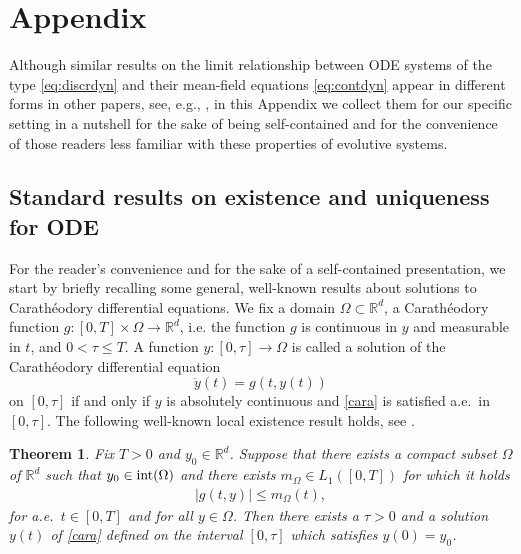 \documentclass[A4paper,11pt]{article}
\newtheorem{theorem}{Theorem}[section]
\theoremstyle{definition}
\newcommand{\R}{\mathbb{R}}
\begin{document}
\section{Appendix}

 Although  similar results on the limit relationship between ODE systems of the type \eqref{eq:discrdyn} and their mean-field equations \eqref{eq:contdyn}
appear in different forms in other papers, see, e.g., \cite{AGS,CanCarRos10,13-Carrillo-Choi-Hauray-MFL,MFOC}, in this Appendix we collect them for our specific setting in a nutshell for the sake of being self-contained and for the convenience of those readers less familiar with these properties of evolutive systems.

\subsection{Standard results on existence and uniqueness for ODE}\label{ap00}

For the reader's convenience and for the sake of a self-contained presentation, we start by briefly recalling some general, well-known results about solutions to Carath{\'e}odory differential equations. We fix a domain $\Omega \subset \R^d$, a Carath{\'e}odory function $g\colon[0,T]\times \Omega \to \R^d$, i.e. the function $g$ is continuous in $y$ and measurable in $t$, and $0<\tau \le T$. A function $y\colon [0,\tau]\to \Omega$ is called a solution of the Carath{\'e}odory differential equation
\begin{equation}\label{cara}
\dot y(t)=g(t, y(t))
\end{equation}
on $[0,\tau]$ if and only if $y$ is absolutely continuous and \eqref{cara} is satisfied a.e.\ in $[0,\tau]$.
The following well-known local existence result holds, see \cite[Chapter 1, Theorem 1]{Fil} .


\begin{theorem}\label{cara-local}
Fix $T > 0$ and $y_0 \in \R^d$. Suppose that there exists a compact subset $\Omega$ of $\R^d$ such that $y_0 \in \textup{int}(\Omega)$ and there exists $m_{\Omega} \in L_1([0,T])$ for which it holds
\begin{align}\label{l1}
|g(t,y)|\le m_{\Omega}(t),
\end{align}
for a.e.\ $t \in [0,T]$ and for all $y \in \Omega$. Then there exists a $\tau > 0$ and a solution $y(t)$ of \eqref{cara} defined on the interval $[0,\tau]$ which satisfies $y(0)=y_0$. 
\end{theorem}
\end{document}
